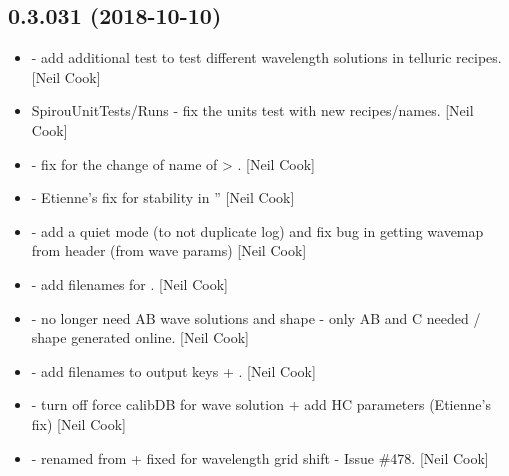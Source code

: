 \documentclass[a4paper,10pt,english]{report}
\begin{document}
\subsection{0.3.031 (2018-10-10)}
\label{\detokenize{misc/changelog:id300}}\begin{itemize}
\item {} 
 - add additional test to test different wavelength
solutions in telluric recipes. {[}Neil Cook{]}

\item {} 
SpirouUnitTests/Runs - fix the units test with new recipes/names.
{[}Neil Cook{]}

\item {} 
 - fix for the change of name of
 \textendash{}\textgreater{} . {[}Neil Cook{]}

\item {} 
 - Etienne’s fix for  stability in
” {[}Neil Cook{]}

\item {} 
 - add a quiet mode (to not duplicate log) and fix bug in
getting wavemap from header (from wave params) {[}Neil Cook{]}

\item {} 
 - add filenames for . {[}Neil Cook{]}

\item {} 
 - no longer need AB wave solutions and shape
- only AB and C needed / shape generated online. {[}Neil Cook{]}

\item {} 
 - add  filenames to output keys +
. {[}Neil Cook{]}

\item {} 
 - turn off force calibDB for wave solution +
add HC parameters (Etienne’s fix) {[}Neil Cook{]}

\item {} 
 - renamed from  + fixed for
wavelength grid shift - Issue \#478. {[}Neil Cook{]}


\end{itemize}
\end{document}
